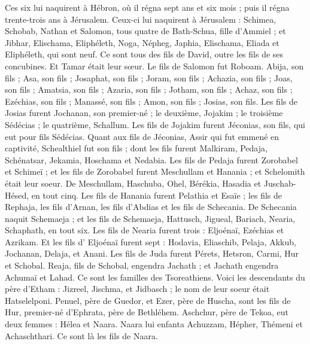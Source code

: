 \begin{multicols}{2}
Ces six lui naquirent à Hébron, où il régna sept ans et six mois ; puis il régna trente-trois ans à Jérusalem.
Ceux-ci lui naquirent à Jérusalem : Schimea, Schobab, Nathan et Salomon, tous quatre de Bath-Schua, fille d'Ammiel ;
et Jibhar, Elischama, Eliphéleth,
Noga, Népheg, Japhia,
Elischama, Eliada et Eliphéleth, qui sont neuf.
Ce sont tous des fils de David, outre les fils de ses concubines. Et Tamar était leur sœur.
Le fils de Salomon fut Roboam. Abija, son fils ; Asa, son fils ; Josaphat, son fils ;
Joram, son fils ; Achazia, son fils ; Joas, son fils ;
Amatsia, son fils ; Azaria, son fils ; Jotham, son fils ;
Achaz, son fils ; Ezéchias, son fils ; Manassé, son fils ;
Amon, son fils ; Josias, son fils.
Les fils de Josias furent Jochanan, son premier-né ; le deuxième, Jojakim ; le troisième Sédécias ; le quatrième, Schallum.
Les fils de Jojakim furent Jéconias, son fils, qui eut pour fils Sédécias.
Quant aux fils de Jéconias, Assir qui fut emmené en captivité, Schealthiel fut son fils ;
dont les fils furent Malkiram, Pedaja, Schénatsar, Jekamia, Hoschama et Nedabia.
Les fils de Pedaja furent Zorobabel et Schimeï ; et les fils de Zorobabel furent Meschullam et Hanania ; et Schelomith était leur soeur.
De Meschullam, Haschuba, Ohel, Bérékia, Hasadia et Juschab-Hésed, en tout cinq.
Les fils de Hanania furent Pelathia et Esaïe ; les fils de Rephaja, les fils d'Arnan, les fils d'Abdias et les fils de Schecania.
De Schecania naquit Schemaeja ; et les fils de Schemaeja, Hattusch, Jigueal, Bariach, Nearia, Schaphath, en tout six.
Les fils de Nearia furent trois : Eljoénaï, Ezéchias et Azrikam.
Et les fils d' Eljoénaï furent sept : Hodavia, Eliaschib, Pelaja, Akkub, Jochanan, Delaja, et Anani.
\VerseOne{}Les fils de Juda furent Pérets, Hetsron, Carmi, Hur et Schobal.
Reaja, fils de Schobal, engendra Jachath ; et Jachath engendra Achumaï et Lahad. Ce sont les familles des Tsoreathiens.
Voici les descendants du père d'Etham : Jizreel, Jischma, et Jidbasch ; le nom de leur soeur était Hatselelponi.
Penuel, père de Guedor, et Ezer, père de Huscha, sont les fils de Hur, premier-né d'Ephrata, père de Bethléhem.
Aschchur, père de Tekoa, eut deux femmes : Hélea et Naara.
Naara lui enfanta Achuzzam, Hépher, Thémeni et Achaschthari. Ce sont là les fils de Naara.

\end{multicols}
